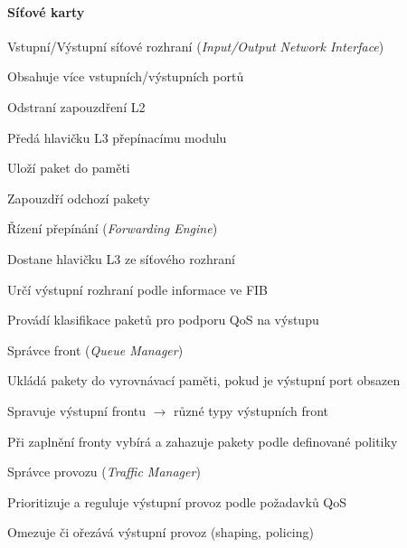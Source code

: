 \paragraph*{Síťové karty} \begin{compactitem}
    \item Vstupní/Výstupní síťové rozhraní (\textit{Input/Output Network Interface}) \begin{compactitem}
        \item Obsahuje více vstupních/výstupních portů
        \item Odstraní zapouzdření L2
        \item Předá hlavičku L3 přepínacímu modulu
        \item Uloží paket do paměti
        \item Zapouzdří odchozí pakety
    \end{compactitem}
    \item Řízení přepínání (\textit{Forwarding Engine}) \begin{compactitem}
        \item Dostane hlavičku L3 ze síťového rozhraní
        \item Určí výstupní rozhraní podle informace ve FIB
        \item Provádí klasifikace paketů pro podporu QoS na výstupu
    \end{compactitem}
    \item Správce front (\textit{Queue Manager}) \begin{compactitem}
        \item Ukládá pakety do vyrovnávací paměti, pokud je výstupní port obsazen
        \item Spravuje výstupní frontu $\rightarrow$ různé typy výstupních front
        \item Při zaplnění fronty vybírá a zahazuje pakety podle definované politiky
    \end{compactitem}
    \item Správce provozu (\textit{Traffic Manager}) \begin{compactitem}
        \item Prioritizuje a reguluje výstupní provoz podle požadavků QoS
        \item Omezuje či ořezává výstupní provoz (shaping, policing)
    \end{compactitem}
\end{compactitem}

